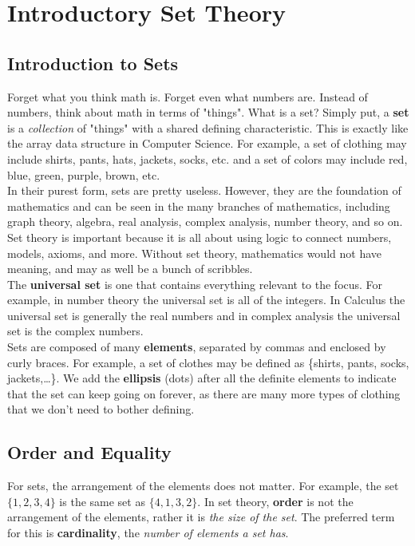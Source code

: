 \section{Introductory Set Theory}

    \subsection{Introduction to Sets}
        Forget what you think math is. Forget even what numbers are. Instead of numbers, think
        about math in terms of "things". What is a set? Simply put, a \textbf{set} is a
        \textit{collection} of "things" with a shared defining characteristic. This is
        exactly like the array data structure in Computer Science. For example, a set of
        clothing may include shirts, pants, hats, jackets, socks, etc. and a set of colors
        may include red, blue, green, purple, brown, etc. \\

        \noindent In their purest form, sets are pretty useless. However, they are the
        foundation of mathematics and can be seen in the many branches of mathematics,
        including graph theory, algebra, real analysis, complex analysis, number theory,
        and so on. Set theory is important because it is all about using logic to connect
        numbers, models, axioms, and more. Without set theory, mathematics would not have
        meaning, and may as well be a bunch of scribbles.\\

        \noindent The \textbf{universal set} is one that contains everything relevant to the
        focus. For example, in number theory the universal set is all of the integers.
        In Calculus the universal set is generally the real numbers and in complex analysis
        the universal set is the complex numbers.\\

        \noindent Sets are composed of many \textbf{elements}, separated by commas and enclosed
        by curly braces. For example, a set of clothes may be defined as \{shirts, pants, socks,
        jackets,\dots\}. We add the \textbf{ellipsis} (dots) after all the definite elements to
        indicate that the set can keep going on forever, as there are many more types of clothing
        that we don't need to bother defining.



    \subsection{Order and Equality}
        For sets, the arrangement of the elements does not matter. For example, the set
        $\{1,2,3,4\}$ is the same set as $\{4,1,3,2\}$. In set theory, \textbf{order} is not the
        arrangement of the elements, rather it is \textit{the size of the set}. The preferred
        term for this is \textbf{cardinality}, the \textit{number of elements a set has}. \\

